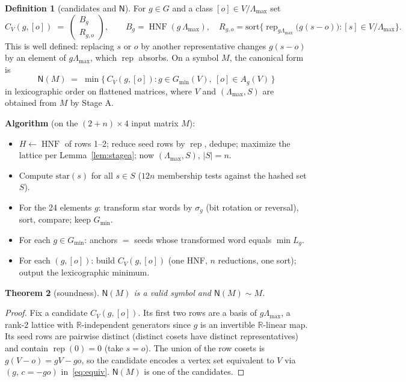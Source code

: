 \documentclass[11pt]{article}
\newtheorem{theorem}{Theorem}[section]
\theoremstyle{definition}
\newtheorem{definition}[theorem]{Definition}
\newcommand{\R}{\mathbb{R}}
\newcommand{\Lmax}{\Lambda_{\max}}
\newcommand{\Gmin}{G_{\min}}
\newcommand{\rep}{\operatorname{rep}}
\newcommand{\N}{\mathsf{N}}
\newcommand{\HNF}{\operatorname{HNF}}
\begin{document}
\begin{definition}[candidates and $\N$]\label{def:N}
For $g\in G$ and a class $[o]\in V/\Lmax$ set
\[
  C_V(g,[o]) \;=\;
  \begin{pmatrix} B_g \\ R_{g,o}\end{pmatrix},
  \qquad
  B_g=\HNF(g\,\Lmax),\quad
  R_{g,o}=\mathrm{sort}\bigl\{\rep_{g\Lmax}\bigl(g(s-o)\bigr) : [s]\in V/\Lmax\bigr\}.
\]
This is well defined: replacing $s$ or $o$ by another representative changes $g(s-o)$ by an
element of $g\Lmax$, which $\rep$ absorbs. On a symbol $M$, the canonical form is
\[
  \N(M) \;=\; \min\bigl\{\,C_V(g,[o]) : g\in\Gmin(V),\ [o]\in A_g(V)\,\bigr\}
\]
in lexicographic order on flattened matrices, where $V$ and $(\Lmax,S)$ are obtained from
$M$ by Stage A.
\end{definition}

\noindent\textbf{Algorithm} (on the $(2+n)\times4$ input matrix $M$):
\begin{itemize}\itemsep2pt
\item[A.] $H\leftarrow\HNF$ of rows 1--2; reduce seed rows by $\rep$, dedupe; maximize the
  lattice per Lemma~\ref{lem:stagea}; now $(\Lmax,S)$, $|S|=n$.
\item[B.] Compute $\mathrm{star}(s)$ for all $s\in S$ ($12n$ membership tests against the
  hashed set $S$).
\item[C.] For the 24 elements $g$: transform star words by $\sigma_g$ (bit rotation or
  reversal), sort, compare; keep $\Gmin$.
\item[D.] For each $g\in\Gmin$: anchors $=$ seeds whose transformed word equals
  $\min L_g$.
\item[E.] For each $(g,[o])$: build $C_V(g,[o])$ (one HNF, $n$ reductions, one sort);
  output the lexicographic minimum.
\end{itemize}

\begin{theorem}[soundness]\label{thm:sound}
$\N(M)$ is a valid symbol and $\N(M)\sim M$.
\end{theorem}

\begin{proof}
Fix a candidate $C_V(g,[o])$. Its first two rows are a basis of $g\Lmax$, a rank-2 lattice
with $\R$-independent generators since $g$ is an invertible $\R$-linear map. Its seed rows
are pairwise distinct (distinct cosets have distinct representatives) and contain
$\rep(0)=0$ (take $s=o$). The union of the row cosets is $g(V-o)=gV-go$, so the candidate
encodes a vertex set equivalent to $V$ via $(g,\,c=-go)$ in~\eqref{eq:equiv}. $\N(M)$ is
one of the candidates.
\end{proof}
\end{document}
